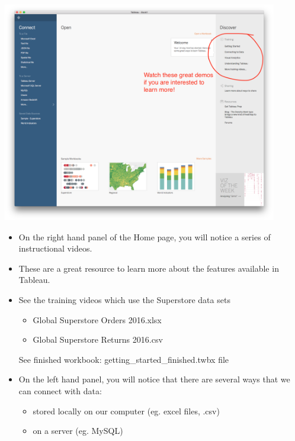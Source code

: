 \documentclass[xcolor=svgnames]{beamer} %
\begin{document}
\begin{frame}
\label{homepage}
\begin{center}
\includegraphics[width=0.9\textwidth]{img/home.png}
\end{center}
\end{frame}



\begin{frame}
\begin{itemize}
\item On the right hand panel of the Home page, you will notice a series of instructional videos.\vfill
\item These are a great resource to learn more about the features available in Tableau.\vfill
\item See the training videos which use the Superstore data sets
\begin{itemize}
\item Global Superstore Orders 2016.xlsx
\item Global Superstore Returns 2016.csv
\end{itemize}
See finished workbook: getting\_started\_finished.twbx file\vfill
\item  On the left hand panel, you will notice that there are several ways that we can connect with data:
\begin{itemize}
\item stored locally on our computer (eg. excel files, .csv)
\item on a server (eg. MySQL)
\end{itemize}
\end{itemize}
\end{frame}
\end{document}
